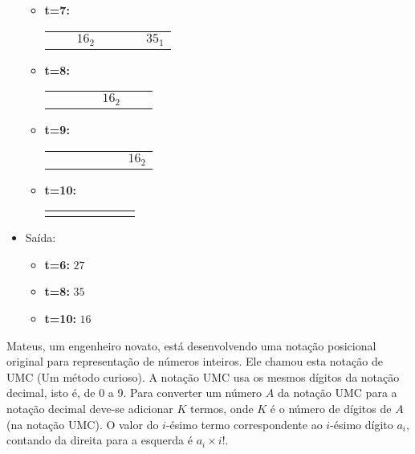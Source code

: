\begin{itemize}
\begin{itemize}
        \item \textbf{t=7:} \begin{tabular}{|p{1cm}|p{1cm}|p{1cm}|p{1cm}|p{1cm}|p{1cm}|p{1cm}|}
            \hline & & & & & &\\ 
            \hline & &$16_2$ & & & & $35_1$ \\ \hline \end{tabular} 
        \item \textbf{t=8:} \begin{tabular}{|p{1cm}|p{1cm}|p{1cm}|p{1cm}|p{1cm}|p{1cm}|p{1cm}|}
            \hline & & & & & &\\ 
            \hline & & & & $16_2$& &  \\ \hline \end{tabular}
        \item \textbf{t=9:} \begin{tabular}{|p{1cm}|p{1cm}|p{1cm}|p{1cm}|p{1cm}|p{1cm}|p{1cm}|}
            \hline & & & & & &\\ 
            \hline & & & & & & $16_2$ \\ \hline \end{tabular}
        \item \textbf{t=10:} \begin{tabular}{|p{1cm}|p{1cm}|p{1cm}|p{1cm}|p{1cm}|p{1cm}|p{1cm}|}
            \hline & & & & & &\\ 
            \hline & & & & & & \\ \hline \end{tabular}
    \end{itemize}
    \item Saída:
    \begin{itemize}
        \item \textbf{t=6:} $27$
        \item \textbf{t=8:} $35$
        \item \textbf{t=10:} $16$
    \end{itemize}
\end{itemize}


\item Mateus, um engenheiro novato, está desenvolvendo uma notação posicional original
para representação de números inteiros. Ele chamou esta notação de UMC 
(Um método curioso). A notação UMC usa os mesmos dígitos da notação decimal,
isto é, de 0 a 9.
%
Para converter um número $A$ da notação UMC para a notação decimal deve-se
adicionar $K$ termos, onde $K$ é o número de dígitos de $A$ (na notação UMC).
O valor do $i$-ésimo termo correspondente ao $i$-ésimo dígito $a_i$, contando
da direita para a esquerda é $a_i \times i!$. 

